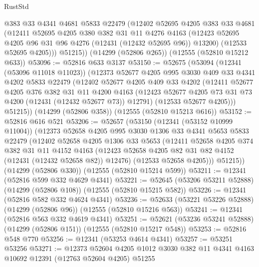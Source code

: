 \begin{lexlean}{RustStd}
\begin{coremodule}
        @383
        @33
        @4341
        @4681
        @5833
        @22479
        (@12402
          @52695
          @4205
          @383
          @33
          @4681
          (@12411
            @52695
            @4205
            @380
            @382
            @31
            @11
            @4276
            @4163
            (@12423 @52695 @4205 @96 @31 @96 @4276 (@12431 (@12432 @52695 @96)) @13200)
            (@12533 @52695 @4205)))
        @51215))
    (@14299 (@52806 @265))
    (@12555 (@52810 @15212 @633))
@53096 := @52816 @633 @3137
@53150 := @52675
    (@53094
      (@12341 (@53096 @11018 @11023))
      (@12373
        @52677
        @4205
        @995
        @3030
        @409
        @33
        @4341
        @4202
        @5833
        @22479
        (@12402
          @52677
          @4205
          @409
          @33
          @4202
          (@12411
            @52677
            @4205
            @376
            @382
            @31
            @11
            @4200
            @4163
            (@12423 @52677 @4205 @73 @31 @73 @4200 (@12431 (@12432 @52677 @73)) @12791)
            (@12533 @52677 @4205)))
        @51215))
    (@14299 (@52806 @358))
    (@12555 (@52810 @15213 @616))
@53152 := @52816 @616 @521
@53206 := @52657
    (@53150
      (@12341 (@53152 @10999 @11004))
      (@12373
        @52658
        @4205
        @995
        @3030
        @1306
        @33
        @4341
        @5653
        @5833
        @22479
        (@12402
          @52658
          @4205
          @1306
          @33
          @5653
          (@12411
            @52658
            @4205
            @374
            @382
            @31
            @11
            @4152
            @4163
            (@12423 @52658 @4205 @82 @31 @82 @4152 (@12431 (@12432 @52658 @82)) @12476)
            (@12533 @52658 @4205)))
        @51215))
    (@14299 (@52806 @330))
    (@12555 (@52810 @15214 @599))
@53211 := @12341 (@52816 @599 @332 @4629 @4341)
@53221 := @52645 (@53206 @53211 @52888) (@14299 (@52806 @108)) (@12555 (@52810 @15215 @582))
@53226 := @12341 (@52816 @582 @332 @4624 @4341)
@53236 := @52633 (@53221 @53226 @52888) (@14299 (@52806 @96)) (@12555 (@52810 @15216 @563))
@53241 := @12341 (@52816 @563 @332 @4619 @4341)
@53251 := @52621 (@53236 @53241 @52888) (@14299 (@52806 @151)) (@12555 (@52810 @15217 @548))
@53253 := @52816 @548 @770
@53256 := @12341 (@53253 @4614 @4341)
@53257 := @53251 @53256
@53271 := @12373
    @52604
    @4205
    @1012
    @3030
    @382
    @11
    @4341
    @4163
    @10692
    @12391
    (@12763 @52604 @4205)
    @51255

\end{coremodule}
\end{lexlean}
